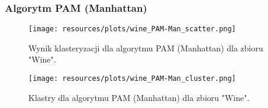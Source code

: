   \subsubsection{Algorytm PAM (Manhattan)} 
    \begin{figure}[H]
      \center
      \texttt{[image: resources/plots/wine\_PAM-Man\_scatter.png]}
      \caption{Wynik klasteryzacji dla algorytmu PAM (Manhattan) dla zbioru "Wine".}
    \end{figure}
    \begin{figure}[H]
      \center
      \texttt{[image: resources/plots/wine\_PAM-Man\_cluster.png]}
      \caption{Klastry dla algorytmu PAM (Manhattan) dla zbioru "Wine".}
    \end{figure}
